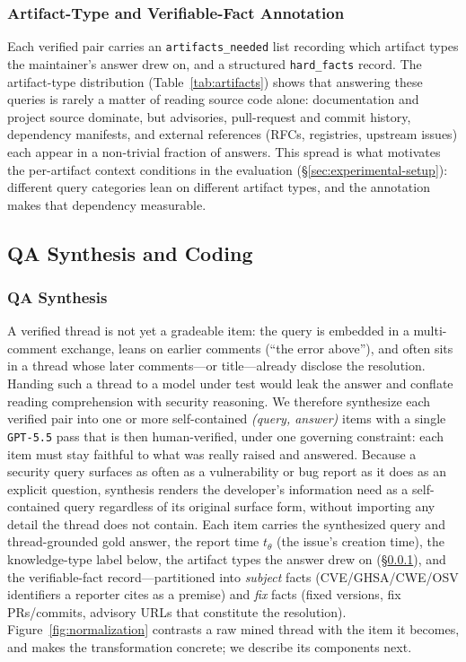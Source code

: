 \subsubsection{Artifact-Type and Verifiable-Fact Annotation}
\label{sec:annotation}

Each verified pair carries an \texttt{artifacts\_needed} list recording which
artifact types the maintainer's answer drew on, and a structured
\texttt{hard\_facts} record. The artifact-type distribution
(Table~\ref{tab:artifacts}) shows that answering these queries is rarely a
matter of reading source code alone: documentation and project source dominate,
but advisories, pull-request and commit history, dependency manifests, and
external references (RFCs, registries, upstream issues) each appear in a
non-trivial fraction of answers. This spread is what motivates the per-artifact
context conditions in the evaluation (\S\ref{sec:experimental-setup}): different
query categories lean on different artifact types, and the annotation makes
that dependency measurable.

\subsection{QA Synthesis and Coding}
\label{sec:phase-normalization}

\subsubsection{QA Synthesis}
\label{sec:normalization}

A verified thread is not yet a gradeable item: the query is embedded in a
multi-comment exchange, leans on earlier comments (``the error above''), and
often sits in a thread whose later comments---or title---already disclose the
resolution. Handing such a thread to a model under test would leak the answer and
conflate reading comprehension with security reasoning. We therefore synthesize
each verified pair into one or more self-contained \emph{(query, answer)}
items with a single \texttt{GPT-5.5} pass that is then human-verified, under one
governing constraint: each item must stay faithful to what was really raised and
answered. Because a security query surfaces as often as a vulnerability or bug
report as it does as an explicit question, synthesis renders the developer's
information need as a self-contained query regardless of its original surface
form, without importing any detail the thread does not contain.
Each item carries the synthesized query and thread-grounded gold answer, the
report time $t_\theta$ (the issue's creation time), the knowledge-type label
below, the artifact types the answer drew on (\S\ref{sec:annotation}), and the
verifiable-fact record---partitioned into \emph{subject} facts (CVE/GHSA/CWE/OSV
identifiers a reporter cites as a premise) and \emph{fix} facts (fixed versions,
fix PRs/commits, advisory URLs that constitute the resolution).
Figure~\ref{fig:normalization} contrasts a raw mined thread with the item it
becomes, and makes the transformation concrete; we describe its components next.

